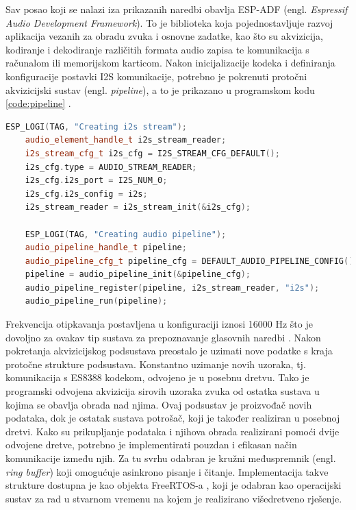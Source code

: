 Sav posao koji se nalazi iza prikazanih naredbi obavlja ESP-ADF
(engl. \textit{Espressif Audio Development Framework}). To je biblioteka koja pojednostavljuje
razvoj aplikacija vezanih za obradu zvuka i osnovne zadatke, kao što su akvizicija, kodiranje i 
dekodiranje različitih formata audio zapisa te komunikacija s računalom ili 
memorijskom karticom.
Nakon inicijalizacije kodeka i definiranja konfiguracije postavki I2S komunikacije,
potrebno je pokrenuti protočni akvizicijski sustav (engl. \textit{pipeline}), 
a to je prikazano u programskom kodu \ref{code:pipeline} .

\begin{lstlisting}[language={C++}, caption={Pokretanje akvizicijskog podsustava}, label={code:pipeline}]
    ESP_LOGI(TAG, "Creating i2s stream");
    audio_element_handle_t i2s_stream_reader;
    i2s_stream_cfg_t i2s_cfg = I2S_STREAM_CFG_DEFAULT();
    i2s_cfg.type = AUDIO_STREAM_READER;
    i2s_cfg.i2s_port = I2S_NUM_0;
    i2s_cfg.i2s_config = i2s;
    i2s_stream_reader = i2s_stream_init(&i2s_cfg);

    ESP_LOGI(TAG, "Creating audio pipeline");
    audio_pipeline_handle_t pipeline;
    audio_pipeline_cfg_t pipeline_cfg = DEFAULT_AUDIO_PIPELINE_CONFIG();
    pipeline = audio_pipeline_init(&pipeline_cfg);
    audio_pipeline_register(pipeline, i2s_stream_reader, "i2s");
    audio_pipeline_run(pipeline);
\end{lstlisting}

Frekvencija otipkavanja postavljena u konfiguraciji iznosi 16000 Hz što
je dovoljno za ovakav tip sustava za prepoznavanje glasovnih naredbi \cite{wardentinyml}.
Nakon pokretanja akvizicijskog podsustava preostalo je uzimati nove
podatke s kraja protočne strukture podsustava. Konstantno uzimanje novih uzoraka, tj. komunikacija
s ES8388 kodekom, odvojeno je u posebnu dretvu. Tako je programski 
odvojena akvizicija sirovih uzoraka zvuka od ostatka sustava u kojima se obavlja obrada nad njima. Ovaj podsustav je proizvođač novih podataka, dok je ostatak sustava potrošač, koji je također realiziran u posebnoj dretvi. Kako su prikupljanje podataka i njihova obrada realizirani pomoći dvije odvojene dretve, potrebno je implementirati pouzdan i efikasan način komunikacije između njih. Za tu svrhu odabran je
kružni međuspremnik (engl. \textit{ring buffer}) koji omogućuje asinkrono pisanje i čitanje. Implementacija takve strukture dostupna je kao objekta FreeRTOS-a 
\cite{ringbufferrr}, koji je odabran kao operacijski sustav za rad u stvarnom vremenu na kojem je realizirano višedretveno rješenje. 



